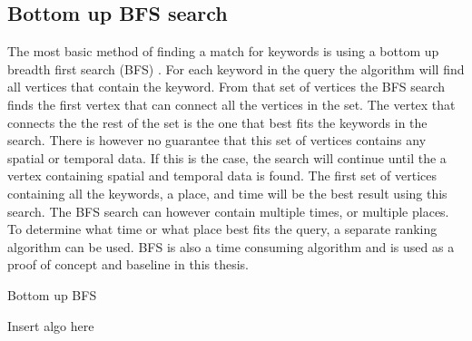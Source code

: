 \subsection{Bottom up BFS search}
The most basic method of finding a match for keywords is using a bottom up breadth first search (BFS) \cite{He:2007:BRK:1247480.1247516}. For each keyword in the query the algorithm will find all vertices that contain the keyword. From that set of vertices the BFS search finds the first vertex that can connect all the vertices in the set. The vertex that connects the the rest of the set is the one that best fits the keywords in the search. There is however no guarantee that this set of vertices contains any spatial or temporal data. If this is the case, the search will continue until the a vertex containing spatial and temporal data is found. The first set of vertices containing all the keywords, a place, and time will be the best result using this search. The BFS search can however contain multiple times, or multiple places. To determine what time or what place best fits the query, a separate ranking algorithm can be used. BFS is also a time consuming algorithm and is used as a proof of concept and baseline in this thesis.

\begin{algorithm}
\caption{Bottom up BFS}
\begin{algorithmic}[1]
Insert algo here


\EndProcedure
\end{algorithmic}
\end{algorithm}

\clearpage
